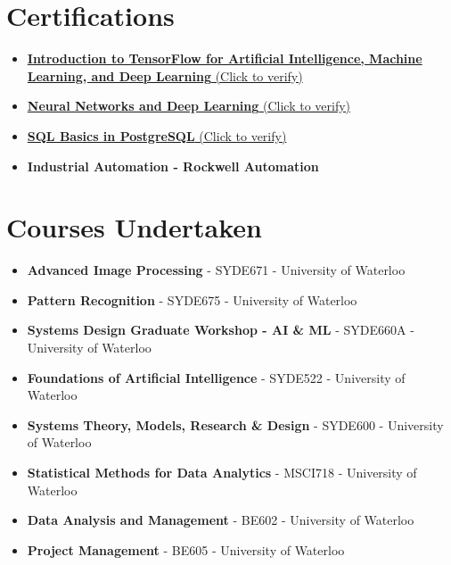 \documentclass{ExpressiveResume}
\begin{document}

\section{Certifications}
\begin{itemize}
\item {\href{https://www.coursera.org/account/accomplishments/verify/C7C8CPGARXJW?utm_source=link&utm_medium=certificate&utm_content=cert_image&utm_campaign=pdf_header_button&utm_product=course}{\textbf{Introduction to TensorFlow for Artificial Intelligence, Machine Learning, and Deep Learning} (Click to verify)}}
\item {\href{https://www.coursera.org/account/accomplishments/verify/ZRBWP4ZFF8YX}{\textbf{Neural Networks and Deep Learning} (Click to verify)}}
\item {\href{https://learnsql.com/files/course-certificate/dcQdkgNWcDbdVjeWXGwKXFTHqxkLQXbYCCJYexdB}{\textbf{SQL Basics in PostgreSQL} (Click to verify)}}
\item {\textbf{Industrial Automation - Rockwell Automation}}
\newline

\end{itemize}


\section{Courses Undertaken}
\begin{itemize}
\item {\textbf{Advanced Image Processing} - SYDE671 - University of Waterloo}
\item {\textbf{Pattern Recognition} - SYDE675 - University of Waterloo}
\item {\textbf{Systems Design Graduate Workshop - AI \& ML} - SYDE660A - University of Waterloo}
\item {\textbf{Foundations of Artificial Intelligence} - SYDE522 - University of Waterloo}
\item {\textbf{Systems Theory, Models, Research \& Design} - SYDE600 - University of Waterloo}

\item {\textbf{Statistical Methods for Data Analytics} - MSCI718 - University of Waterloo}
\item {\textbf{Data Analysis and Management} - BE602 - University of Waterloo}
\item {\textbf{Project Management} - BE605 - University of Waterloo}
\end{itemize}
\end{document}
